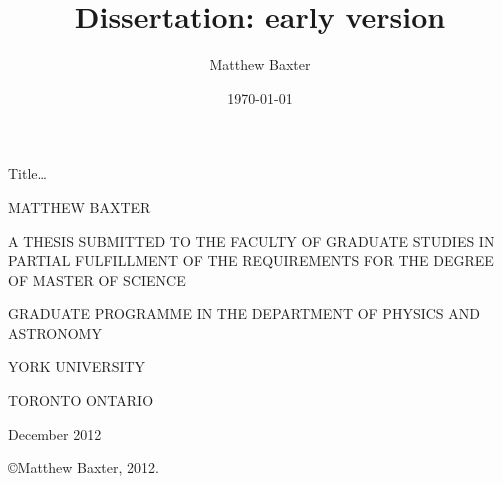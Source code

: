 \documentclass[letterpaper, 10 pt]{report}
\title{Dissertation: early version}
\author{Matthew Baxter}
\date{\today}
\begin{document}

\begin{titlepage} %

   \centering
   
   \begin{Large}
      Title\dots
   \end{Large}
   
   \vspace{2 cm}
   
   MATTHEW BAXTER
   
   \vspace{2 cm}
   
   A THESIS SUBMITTED TO THE FACULTY OF GRADUATE STUDIES IN PARTIAL FULFILLMENT OF THE REQUIREMENTS FOR
   THE DEGREE OF MASTER OF SCIENCE
   
   \vspace{2 cm}
   
   GRADUATE PROGRAMME IN THE DEPARTMENT OF PHYSICS AND ASTRONOMY
   
   YORK UNIVERSITY
   
   TORONTO ONTARIO
   
   December 2012
   
   \vspace{3.5 cm}
   
   \copyright Matthew Baxter, 2012.   

   \thispagestyle{empty}

\end{titlepage}

\cleardoublepage
{}
{}

\begin{abstract}
   
   \thispagestyle{plain}
   \setcounter{page}{2}

\end{abstract}

\setcounter{page}{3}

\cleardoublepage
{}
{}
\tableofcontents

\cleardoublepage
{}
{}
\listoftables

\cleardoublepage
{}
{}
\listoffigures

\newpage

\end{document}
